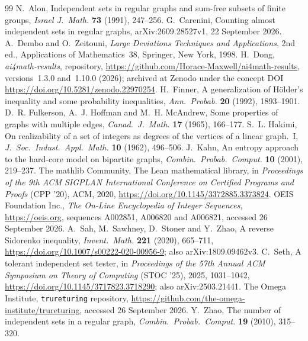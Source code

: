 \documentclass[11pt]{article}
\theoremstyle{remark}
\newcommand{\repoversion}{1.10.0}
\begin{document}
\begin{thebibliography}{99}
N.~Alon, Independent sets in regular graphs and sum-free subsets of finite
groups, \emph{Israel J.\ Math.} \textbf{73} (1991), 247--256.
G.~Carenini, Counting almost independent sets in regular graphs,
arXiv:2609.28527v1, 22 September 2026.
A.~Dembo and O.~Zeitouni, \emph{Large Deviations Techniques and
Applications}, 2nd ed., Applications of Mathematics~38, Springer, New York,
1998.
H.~Dong, \emph{ai4math-results}, repository,
\url{https://github.com/Horace-Maxwell/ai4math-results}, versions~1.3.0
and~\repoversion{} (2026); archived at Zenodo under the concept DOI
\url{https://doi.org/10.5281/zenodo.22970254}.
H.~Finner, A generalization of Hölder's inequality and some probability
inequalities, \emph{Ann.\ Probab.} \textbf{20} (1992), 1893--1901.
D.~R. Fulkerson, A.~J. Hoffman and M.~H. McAndrew, Some properties of graphs
with multiple edges, \emph{Canad.\ J.\ Math.} \textbf{17} (1965), 166--177.
S.~L. Hakimi, On realizability of a set of integers as degrees of the
vertices of a linear graph.~I, \emph{J.\ Soc.\ Indust.\ Appl.\ Math.}
\textbf{10} (1962), 496--506.
J.~Kahn, An entropy approach to the hard-core model on bipartite graphs,
\emph{Combin.\ Probab.\ Comput.} \textbf{10} (2001), 219--237.
The mathlib Community, The Lean mathematical library, in \emph{Proceedings of
the 9th ACM SIGPLAN International Conference on Certified Programs and Proofs}
(CPP '20), ACM, 2020, \url{https://doi.org/10.1145/3372885.3373824}.
OEIS Foundation Inc., \emph{The On-Line Encyclopedia of Integer Sequences},
\url{https://oeis.org}, sequences A002851, A006820 and A006821, accessed 26
September 2026.
A.~Sah, M.~Sawhney, D.~Stoner and Y.~Zhao, A reverse Sidorenko inequality,
\emph{Invent.\ Math.} \textbf{221} (2020), 665--711,
\url{https://doi.org/10.1007/s00222-020-00956-9}; also arXiv:1809.09462v3.
C.~Seth, A tolerant independent set tester, in \emph{Proceedings of the 57th
Annual ACM Symposium on Theory of Computing} (STOC '25), 2025, 1031--1042,
\url{https://doi.org/10.1145/3717823.3718290}; also arXiv:2503.21441.
The Omega Institute, \texttt{trureturing} repository,
\url{https://github.com/the-omega-institute/trureturing}, accessed 26
September 2026.
Y.~Zhao, The number of independent sets in a regular graph,
\emph{Combin.\ Probab.\ Comput.} \textbf{19} (2010), 315--320.
\end{thebibliography}
\end{document}
